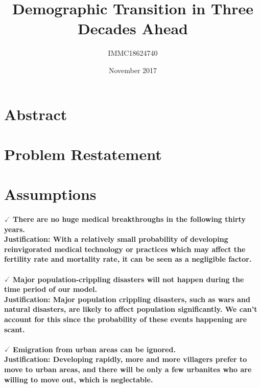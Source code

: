 \documentclass{article}
\title{Demographic Transition in Three Decades Ahead}
\author{IMMC18624740}
\date{November 2017}
\begin{document}
\maketitle

\section{Abstract}
\paragraph{}

\section{Problem Restatement}
\paragraph{}

\section{Assumptions}
\paragraph{$\checked$ There are no huge medical breakthroughs in the following thirty years. \\
Justification: With a relatively small probability of developing reinvigorated medical technology or practices which may affect the fertility rate and mortality rate, it can be seen as a negligible factor. }
\paragraph{$\checked$ Major population-crippling disasters will not happen during the time period of our model. \\
Justification: Major population crippling disasters, such as wars and natural disasters, are likely to affect population significantly. We can't account for this since the probability of these events happening are scant.}
\paragraph{$\checked$ Emigration from urban areas can be ignored. \\
Justification: Developing rapidly, more and more villagers prefer to move to urban areas, and there will be only a few urbanites who are willing to move out, which is neglectable. }
\end{document}
